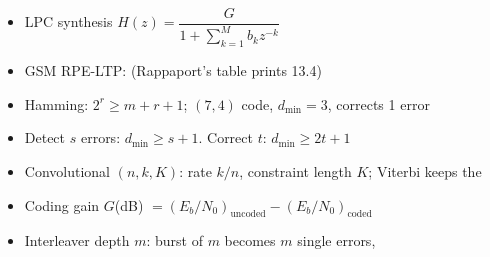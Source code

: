{\begin{itemize}
        Vocoders: , mechanical, talker dependent
  \item LPC synthesis $H(z) = \dfrac{G}{1+\sum_{k=1}^{M} b_k z^{-k}}$ \ 
  \item GSM RPE-LTP:  (Rappaport's table prints 13.4)
  \item Hamming: $2^r \ge m+r+1$; $(7,4)$ code, $d_{\min}=3$, corrects 1 error
  \item Detect $s$ errors: $d_{\min} \ge s+1$. Correct $t$: $d_{\min} \ge 2t+1$
  \item Convolutional $(n,k,K)$: rate $k/n$, constraint length $K$;
        Viterbi keeps the 
  \item Coding gain $G$(dB) $= (E_b/N_0)_{\text{uncoded}} - (E_b/N_0)_{\text{coded}}$
  \item Interleaver depth $m$: burst of $m$ becomes $m$ single errors,
\end{itemize}}

